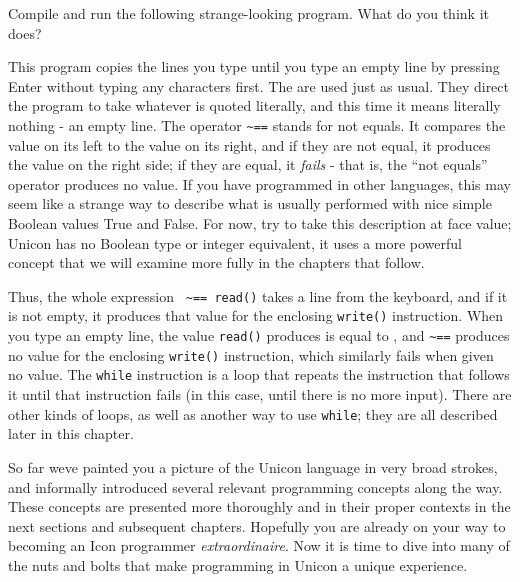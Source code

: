
\noindent Compile and run the following strange-looking program.
What do you think it does?


This program copies the lines you type until you type an empty line by
pressing Enter without typing any characters first. The
\texttt{{\textquotedbl}{\textquotedbl}} are used just as usual. They
direct the program to take whatever is quoted literally, and this time
it means literally nothing - an empty line. The operator
\texttt{\~{}==} stands for {\textquotedbl}not
equals{\textquotedbl}. It compares the value on its left to the value
on its right, and if they are not equal, it produces the value on the
right side; if they are equal, it \textit{fails} - that is, the {\textquotedblleft}not
equals{\textquotedblright} operator produces no value. If you have
programmed in other languages, this may seem like a strange way to
describe what is usually performed with nice simple Boolean values True
and False. For now, try to take this description at face value; Unicon
has no Boolean type or integer equivalent, it uses a more powerful
concept that we will examine more fully in the chapters that follow.

Thus, the whole expression \texttt{{\textquotedbl}{\textquotedbl} \~{}==
read()} takes a line from the keyboard, and if it is not empty, it
produces that value for the enclosing \texttt{write()} instruction.
When you type an empty line, the value \texttt{read()} produces is
equal to \texttt{{\textquotedbl}{\textquotedbl}}, and \texttt{\~{}==}
produces no value for the enclosing \texttt{write()} instruction, which
similarly fails when given no value. The \texttt{while}
instruction is a {\textquotedbl}loop{\textquotedbl} that
repeats the instruction that follows it until that instruction fails
(in this case, until there is no more input). There are other kinds of
loops, as well as another way to use \texttt{while}; they are all
described later in this chapter.

So far we{\textquotesingle}ve painted you a picture of the Unicon
language in very broad strokes, and informally introduced several
relevant programming concepts along the way. These concepts are
presented more thoroughly and in their proper contexts in the next
sections and subsequent chapters. Hopefully you are already on your way
to becoming an Icon programmer \textit{extraordinaire}. Now it is time
to dive into many of the nuts and bolts that make programming in Unicon
a unique experience.


